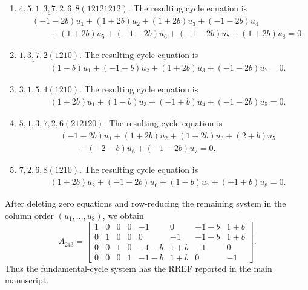 \documentclass[11pt]{article}
\begin{document}
\begin{enumerate}[label=(\arabic*)]
\item $ \underline{4,5,1,3,7,2,6,8}(12121212) $.  The resulting cycle equation is
\[
\begin{aligned}
&\left(-1 - 2b\right)u_{1} + \left(1 + 2b\right)u_{2} + \left(1 + 2b\right)u_{3} + \left(-1 - 2b\right)u_{4}\\ &\qquad  + \left(1 + 2b\right)u_{5} + \left(-1 - 2b\right)u_{6} + \left(-1 - 2b\right)u_{7} + \left(1 + 2b\right)u_{8}=0.
\end{aligned}
\]
\item $ \underline{1,3,7,2}(1210) $.  The resulting cycle equation is
\[
\begin{aligned}
&\left(1 - b\right)u_{1} + \left(-1 + b\right)u_{2} + \left(1 + 2b\right)u_{3} + \left(-1 - 2b\right)u_{7}=0.
\end{aligned}
\]
\item $ \underline{3,1,5,4}(1210) $.  The resulting cycle equation is
\[
\begin{aligned}
&\left(1 + 2b\right)u_{1} + \left(1 - b\right)u_{3} + \left(-1 + b\right)u_{4} + \left(-1 - 2b\right)u_{5}=0.
\end{aligned}
\]
\item $ \underline{5,1,3,7,2,6}(212120) $.  The resulting cycle equation is
\[
\begin{aligned}
&\left(-1 - 2b\right)u_{1} + \left(1 + 2b\right)u_{2} + \left(1 + 2b\right)u_{3} + \left(2 + b\right)u_{5}\\ &\qquad  + \left(-2 - b\right)u_{6} + \left(-1 - 2b\right)u_{7}=0.
\end{aligned}
\]
\item $ \underline{7,2,6,8}(1210) $.  The resulting cycle equation is
\[
\begin{aligned}
&\left(1 + 2b\right)u_{2} + \left(-1 - 2b\right)u_{6} + \left(1 - b\right)u_{7} + \left(-1 + b\right)u_{8}=0.
\end{aligned}
\]
\end{enumerate}
After deleting zero equations and row-reducing the remaining system in the column order $(u_1,\ldots,u_8)$, we obtain
\[
A_{243}=
\begin{bmatrix}
1 & 0 & 0 & 0 & -1 & 0 & -1 - b & 1 + b \\
0 & 1 & 0 & 0 & 0 & -1 & -1 - b & 1 + b \\
0 & 0 & 1 & 0 & -1 - b & 1 + b & -1 & 0 \\
0 & 0 & 0 & 1 & -1 - b & 1 + b & 0 & -1
\end{bmatrix}.
\]
Thus the fundamental-cycle system has the RREF reported in the main manuscript.
\end{document}
